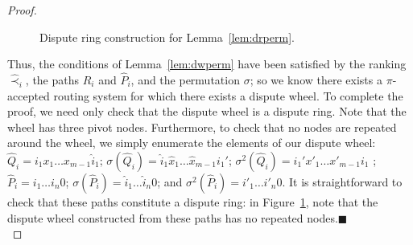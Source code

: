 \begin{proof}
\begin{figure}
\centering
\begin{psfrags}
%
%
\end{psfrags}
\caption{Dispute ring construction for Lemma~\ref{lem:drperm}.}
\label{fig:lemdr}
\end{figure}

Thus, the conditions of Lemma~\ref{lem:dwperm} have been satisfied by
the ranking $\hat{\prec}_i$, the paths $R_i$ and
$\hat{P}_i$, and the permutation $\sigma$; so we know there exists a
$\pi$-accepted routing system for which there exists a 
dispute wheel.  To complete the proof, we need only check that
the dispute wheel is a dispute ring.  Note that the wheel has three
pivot nodes.  Furthermore, to check that no nodes are repeated around
the wheel, we simply enumerate the elements of our dispute wheel:
$\hat{Q}_i = i_1 x_1 \ldots x_{m-1} \hat{i}_1$;
$\sigma(\hat{Q}_i) = \hat{i}_1 \hat{x}_1 \ldots \hat{x}_{m-1} i_1'$;
$\sigma^2(\hat{Q}_i) = i_1' x'_1 \ldots x'_{m-1} i_1$ ;
$\hat{P}_i = i_1 \ldots i_n 0$;
$\sigma(\hat{P}_i) = \hat{i}_1 \ldots \hat{i}_n 0$; and
$\sigma^2(\hat{P}_i) = i'_1 \ldots i'_n 0$.
It is straightforward to check that these paths constitute a dispute
ring: in Figure~\ref{fig:lemdr}, note that the dispute
wheel constructed from these paths has no repeated
nodes.\hfill$\blacksquare$\\ 


\end{proof}
